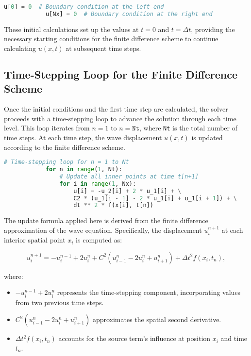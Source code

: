 \documentclass{article}
\begin{document}
		\begin{lstlisting}[language=Python, caption=Boundary Conditions at First Time Step]
			u[0] = 0  # Boundary condition at the left end
			u[Nx] = 0  # Boundary condition at the right end
		\end{lstlisting}
		
		These initial calculations set up the values at $t = 0$ and $t = \Delta t$, providing the necessary starting conditions for the finite difference scheme to continue calculating $u(x, t)$ at subsequent time steps.
		
		\subsection{Time-Stepping Loop for the Finite Difference Scheme}
		
		Once the initial conditions and the first time step are calculated, the solver proceeds with a time-stepping loop to advance the solution through each time level. This loop iterates from $n = 1$ to $n = \texttt{Nt}$, where \texttt{Nt} is the total number of time steps. At each time step, the wave displacement $u(x, t)$ is updated according to the finite difference scheme.
		
		\begin{lstlisting}[language=Python, caption=Time-Stepping Loop]
			# Time-stepping loop for n = 1 to Nt
			for n in range(1, Nt):
				# Update all inner points at time t[n+1]
				for i in range(1, Nx):
					u[i] = -u_2[i] + 2 * u_1[i] + \
					C2 * (u_1[i - 1] - 2 * u_1[i] + u_1[i + 1]) + \
					dt ** 2 * f(x[i], t[n])
		\end{lstlisting}
		
		The update formula applied here is derived from the finite difference approximation of the wave equation. Specifically, the displacement $u_i^{n+1}$ at each interior spatial point $x_i$ is computed as:
		
		\begin{equation}
			u_i^{n+1} = -u_i^{n-1} + 2 u_i^n + C^2 \left( u_{i-1}^n - 2 u_i^n + u_{i+1}^n \right) + \Delta t^2 f(x_i, t_n),
		\end{equation}
		
		where:
		\begin{itemize}
			\item $-u_i^{n-1} + 2 u_i^n$ represents the time-stepping component, incorporating values from two previous time steps.
			\item $C^2 \left( u_{i-1}^n - 2 u_i^n + u_{i+1}^n \right)$ approximates the spatial second derivative.
			\item $\Delta t^2 f(x_i, t_n)$ accounts for the source term’s influence at position $x_i$ and time $t_n$.
		\end{itemize}
		
\end{document}
